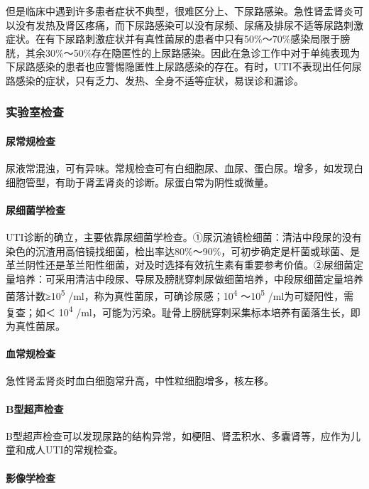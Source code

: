 但是临床中遇到许多患者症状不典型，很难区分上、下尿路感染。急性肾盂肾炎可以没有发热及肾区疼痛，而下尿路感染可以没有尿频、尿痛及排尿不适等尿路刺激症状。在有下尿路刺激症状并有真性菌尿的患者中只有50\%～70\%感染局限于膀胱，其余30\%～50\%存在隐匿性的上尿路感染。因此在急诊工作中对于单纯表现为下尿路感染的患者也应警惕隐匿性上尿路感染的存在。有时，UTI不表现出任何尿路感染的症状，只有乏力、发热、全身不适等症状，易误诊和漏诊。

\subsubsection{实验室检查}

\paragraph{尿常规检查}

尿液常混浊，可有异味。常规检查可有白细胞尿、血尿、蛋白尿。增多，如发现白细胞管型，有助于肾盂肾炎的诊断。尿蛋白常为阴性或微量。

\paragraph{尿细菌学检查}

UTI诊断的确立，主要依靠尿细菌学检查。①尿沉渣镜检细菌：清洁中段尿的没有染色的沉渣用高倍镜找细菌，检出率达80\%～90\%，可初步确定是杆菌或球菌、是革兰阴性还是革兰阳性细菌，对及时选择有效抗生素有重要参考价值。②尿细菌定量培养：可采用清洁中段尿、导尿及膀胱穿刺尿做细菌培养，中段尿细菌定量培养菌落计数≥10\textsuperscript{5}
/ml，称为真性菌尿，可确诊尿感；10\textsuperscript{4}
～10\textsuperscript{5} /ml为可疑阳性，需复查；如＜
10\textsuperscript{4}
/ml，可能为污染。耻骨上膀胱穿刺采集标本培养有菌落生长，即为真性菌尿。

\paragraph{血常规检查}

急性肾盂肾炎时血白细胞常升高，中性粒细胞增多，核左移。

\paragraph{B型超声检查}

B型超声检查可以发现尿路的结构异常，如梗阻、肾盂积水、多囊肾等，应作为儿童和成人UTI的常规检查。

\paragraph{影像学检查}

